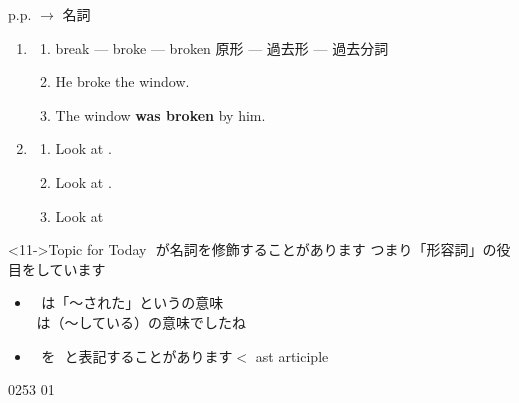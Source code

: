 \documentclass[aspectratio=169,xcolor={dvipsnames,table}]{beamer}
\begin{document}
\begin{frame}[plain,t]{p.p. $\longrightarrow$ 名詞}
  \begin{enumerate}
    \item \begin{enumerate}
            \item<1-> break --- broke --- broken%
                  \hfill{}{\scriptsize 原形 --- 過去形 --- 過去分詞}
            \item<2-> He broke the window.
            \item<3-> The window \textbf{was broken} by him.\hfill{}
          \end{enumerate}
    \item \begin{enumerate}
            \item<5-> Look at .%
                  \hfill{}
            \item<7-> Look at .%
                  \hfill{}
            \item<9-> Look at %
                  \hfill{}
          \end{enumerate}
  \end{enumerate}

  \vspace{8pt}

  \begin{block}<11->{Topic for Today}\small
    \,\,が名詞を修飾することがあります%
    \hfill{\scriptsize つまり「形容詞」の役目をしています}

    \begin{itemize}[square]\small
      \item<12-> \,\,\,\,は「～された」というの意味\\
            \hfill{\scriptsize {}\,\,は（～している）の意味でしたね}
      \item<13-> \,\,\,\,を\,\,\,\,と表記することがあります\hfill{\scriptsize $<$ ast articiple}
    \end{itemize}
  \end{block}

  \vspace*{-12pt}

  \hfill{\tiny 0253}\,{\scriptsize {}}\,{\tiny 01}
\end{frame}
\end{document}

